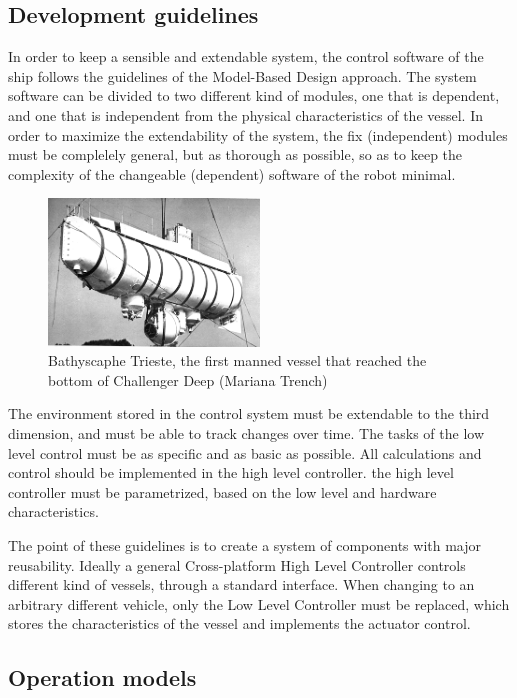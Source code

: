 \subsection*{Development guidelines}
In order to keep a sensible and extendable system, the control software of the ship follows the guidelines of the Model-Based Design approach. The system software can be divided to two different kind of modules, one that is dependent, and one that is independent from the physical characteristics of the vessel. In order to maximize the extendability of the system, the fix (independent) modules must be complelely general, but as thorough as possible, so as to keep the complexity of the changeable (dependent) software of the robot minimal.
\begin{figure}
  \begin{center}
    \includegraphics[width=0.5\textwidth]{img/trieste}
  \end{center}
  \caption{Bathyscaphe Trieste, the first manned vessel that reached the bottom of Challenger Deep (Mariana Trench)\cite{trieste}}
\end{figure}

The environment stored in the control system must be extendable to the third dimension, and must be able to track changes over time.
The tasks of the low level control must be as specific and as basic as possible. All calculations and control should be implemented in the high level controller.
the high level controller must be parametrized, based on the low level and hardware characteristics.

The point of these guidelines is to create a system of components with major reusability. Ideally a general Cross-platform High Level Controller controls different kind of vessels, through a standard interface. When changing to an arbitrary different vehicle, only the Low Level Controller must be replaced, which stores the characteristics of the vessel and implements the actuator control.

\subsection{Operation models}

